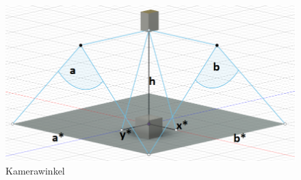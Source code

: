 \begin{figure}[h]
	\centering
	\includegraphics[scale=0.3]{"Grafiken/Kameraformel.png"}
	\caption{Kamerawinkel}
	\label{fig:meine-grafik}
\end{figure}
